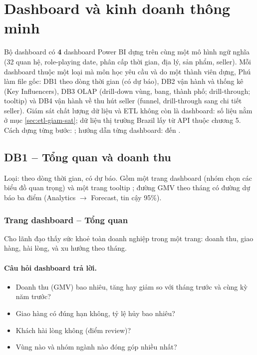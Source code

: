 \section{Dashboard và kinh doanh thông minh}\label{sec:dashboard}

Bộ dashboard có \textbf{4} dashboard Power BI dựng trên cùng một mô hình ngữ nghĩa (32 quan hệ, role-playing date, phân cấp thời gian, địa lý, sản phẩm, seller). Mỗi dashboard thuộc một loại mà môn học yêu cầu và do một thành viên dựng, Phú làm file gốc: DB1 theo dòng thời gian (có dự báo), DB2 vận hành và thống kê (Key Influencers), DB3 OLAP (drill-down vùng, bang, thành phố; drill-through; tooltip) và DB4 vận hành về thu hút seller (funnel, drill-through sang chi tiết seller). Giám sát chất lượng dữ liệu và ETL không còn là dashboard: số liệu nằm ở mục \ref{sec:etl-giam-sat}; dữ liệu thị trường Brazil lấy từ API thuộc chương 5. Cách dựng từng bước: ; hướng dẫn từng dashboard:  đến .

\subsection{DB1 -- Tổng quan và doanh thu}\label{sec:db1}
Loại: theo dòng thời gian, có dự báo. Gồm một trang dashboard (nhóm chọn các biểu đồ quan trọng) và một trang tooltip ; đường GMV theo tháng có đường dự báo ba điểm (Analytics $\rightarrow$ Forecast, tin cậy 95\%).

\subsubsection*{Trang dashboard -- Tổng quan}

Cho lãnh đạo thấy sức khoẻ toàn doanh nghiệp trong một trang: doanh thu, giao hàng, hài lòng, và xu hướng theo tháng.

\paragraph{Câu hỏi dashboard trả lời.}

\begin{itemize}
  \item Doanh thu (GMV) bao nhiêu, tăng hay giảm so với tháng trước và cùng kỳ năm trước?
  \item Giao hàng có đúng hạn không, tỷ lệ hủy bao nhiêu?
  \item Khách hài lòng không (điểm review)?
  \item Vùng nào và nhóm ngành nào đóng góp nhiều nhất?
\end{itemize}

